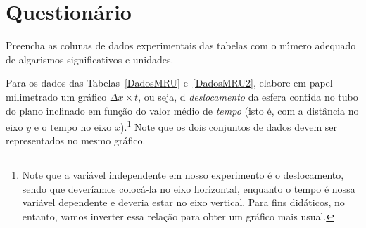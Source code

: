 \vspace{15mm}

\begin{fullwidth}
\noindent{}
\vspace{5mm}

\noindent{}

\noindent{}

\noindent{}

\noindent{}

\noindent{}
\end{fullwidth}

\vspace{5mm}

\section{Questionário}

\begin{question}[type={exam}]
Preencha as colunas de dados experimentais das tabelas com o número adequado de algarismos significativos e unidades.
\end{question}

\begin{question}[type={exam}]
Para os dados das Tabelas~\ref{DadosMRU} e~\ref{DadosMRU2}, elabore em papel milimetrado um gráfico $\Delta x \times t$, ou seja, d \emph{deslocamento} da esfera contida no tubo do plano inclinado em função do valor médio de \emph{tempo} (isto é, com a distância no eixo $y$ e o tempo no eixo $x$).\footnote{Note que a variável independente em nosso experimento é o deslocamento, sendo que deveríamos colocá-la no eixo horizontal, enquanto o tempo é nossa variável dependente e deveria estar no eixo vertical. Para fins didáticos, no entanto, vamos inverter essa relação para obter um gráfico mais usual.} Note que os dois conjuntos de dados devem ser representados no mesmo gráfico.
\end{question}

